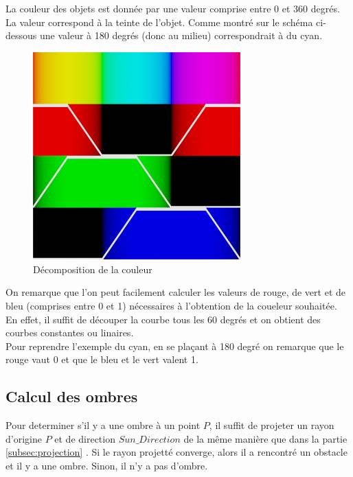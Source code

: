La couleur des objets est donnée par une valeur comprise entre 0 et 360 degrés. La valeur correspond à la teinte de l'objet. Comme montré sur le schéma ci-dessous une valeur à 180 degrés (donc au milieu) correspondrait à du cyan.

\begin{figure}[h]
    \centering
    \includegraphics[width=8cm]{images/huetorgb.jpg}
    \caption{Décomposition de la couleur }\label{fig:huetorb}
\end{figure}

On remarque que l'on peut facilement calculer les valeurs de rouge, de vert et de bleu (comprises entre 0 et 1) nécessaires à l'obtention de la coueleur souhaitée.\\
En effet, il suffit de découper la courbe tous les 60 degrés et on obtient des courbes constantes ou linaires.\\
Pour reprendre l'exemple du cyan, en se plaçant à 180 degré on remarque que le rouge vaut 0 et que le bleu et le vert valent 1.
\subsection{Calcul des ombres}
Pour determiner s'il y a une ombre à un point $P$, il suffit de projeter un rayon d'origine $P$ et de direction $Sun\_Direction$ de la même manière que dans la partie \ref{subsec:projection} . Si le rayon projetté converge, alors il a rencontré un obstacle et il y a une ombre. Sinon, il n'y a pas d'ombre.